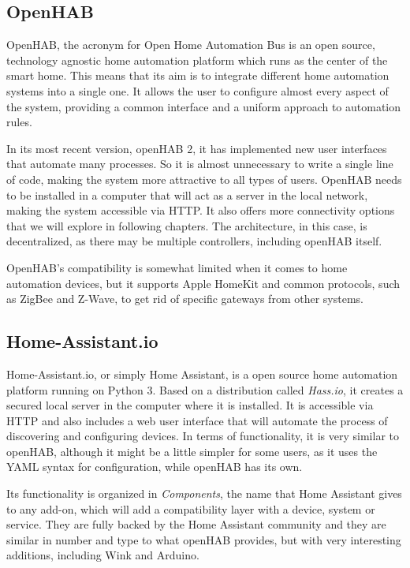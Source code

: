 \subsection{OpenHAB}
OpenHAB, the acronym for Open Home Automation Bus is an open source, technology agnostic home automation platform which runs
as the center of the smart home. \cite{openHABDocs} This means that its aim is to integrate different home automation systems into
a single one. It allows the user to configure almost every aspect of the system, providing a common interface and a uniform approach
to automation rules.

In its most recent version, openHAB 2, it has implemented new user interfaces that automate many processes. So it is almost unnecessary
to write a single line of code, making the system more attractive to all types of users. OpenHAB needs to be installed in a computer that
will act as a server in the local network, making the system accessible via HTTP. It also offers more connectivity options that we will explore
in following chapters. The architecture, in this case, is decentralized, as there may be multiple controllers, including openHAB itself.

OpenHAB's compatibility is somewhat limited when it comes to home automation devices, but it supports Apple HomeKit and common
protocols, such as ZigBee and Z-Wave, to get rid of specific gateways from other systems.\cite{openHABAddons}

\subsection{Home-Assistant.io}
Home-Assistant.io, or simply Home Assistant, is a open source home automation platform running on Python 3.\cite{homeAssistantio}
Based on a distribution called \textit{Hass.io}, it creates a secured local server in the computer where it is installed. It is accessible via
HTTP and also includes a web user interface that will automate the process of discovering and configuring devices. In terms of
functionality, it is very similar to openHAB, although it might be a little simpler for some users, as it uses the YAML syntax for
configuration, while openHAB has its own.

Its functionality is organized in \textit{Components}, the name that Home Assistant gives to any add-on, which will add a compatibility
layer with a device, system or service. They are fully backed by the Home Assistant community and they are similar in number and type to
what openHAB provides, but with very interesting additions, including Wink and Arduino.

